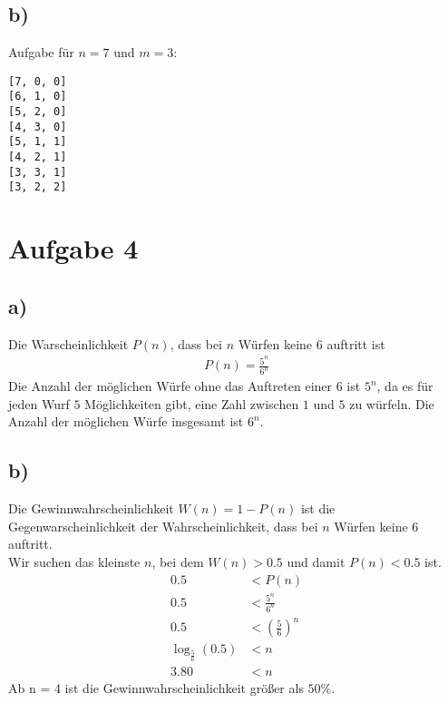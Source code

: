 \documentclass[a4paper]{scrartcl}
\begin{document}
\subsection*{b)}
Aufgabe für $n = 7$ und $m = 3$:
\begin{lstlisting}
[7, 0, 0]
[6, 1, 0]
[5, 2, 0]
[4, 3, 0]
[5, 1, 1]	
[4, 2, 1]
[3, 3, 1]
[3, 2, 2]
\end{lstlisting}

\section*{Aufgabe 4}
\subsection*{a)}
Die Warscheinlichkeit $P(n)$, dass bei $n$ Würfen keine $6$ auftritt ist 
\begin{align*}
	P(n) = \frac{5^n}{6^n}
\end{align*}
Die Anzahl der möglichen Würfe ohne das Auftreten einer $6$ ist $5^n$, da es für jeden Wurf $5$ 
Möglichkeiten gibt, eine Zahl zwischen $1$ und $5$ zu würfeln. Die Anzahl der möglichen Würfe 
insgesamt ist $6^n$.	
\newpage
\subsection*{b)}
Die Gewinnwahrscheinlichkeit $W(n) = 1 - P(n)$ ist die Gegenwarscheinlichkeit der Wahrscheinlichkeit, 
dass bei $n$ Würfen keine $6$ auftritt. \\
Wir suchen das kleinste $n$, bei dem $W(n) > 0.5$ und damit $ P(n) < 0.5$ ist.
\begin{align*}
	0.5 &< P(n) \\
	0.5 &< \frac{5^n}{6^n} \\
	0.5 &< \left(\frac{5}{6}\right)^n \\
	\log_{\frac{5}{6}}(0.5) &< n \\
	3.80 &< n
\end{align*} 
Ab n = 4 ist die Gewinnwahrscheinlichkeit größer als $50\%$.
\end{document}
